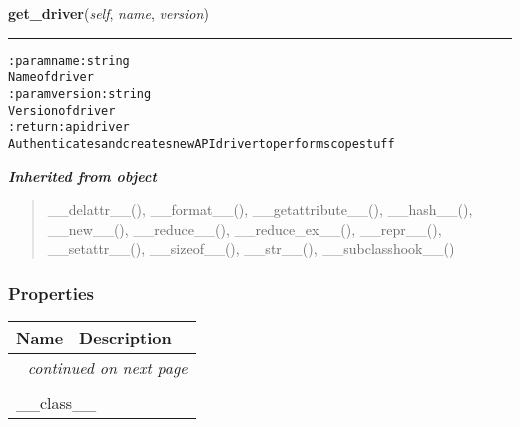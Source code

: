     \label{hal:internet:google:gauthenticator:GoogleApiOAuth:get_driver}

    \vspace{0.5ex}

\hspace{.8\funcindent}\begin{boxedminipage}{\funcwidth}

    \raggedright \textbf{get\_driver}(\textit{self}, \textit{name}, \textit{version})

    \vspace{-1.5ex}

    \rule{\textwidth}{0.5\fboxrule}
\setlength{\parskip}{2ex}
\begin{alltt}

:param name: string
    Name of driver
:param version: string
    Version of driver
:return: api driver
    Authenticates and creates new API driver to perform scope stuff
\end{alltt}

\setlength{\parskip}{1ex}
    \end{boxedminipage}


\large{\textbf{\textit{Inherited from object}}}

\begin{quote}
\_\_delattr\_\_(), \_\_format\_\_(), \_\_getattribute\_\_(), \_\_hash\_\_(), \_\_new\_\_(), \_\_reduce\_\_(), \_\_reduce\_ex\_\_(), \_\_repr\_\_(), \_\_setattr\_\_(), \_\_sizeof\_\_(), \_\_str\_\_(), \_\_subclasshook\_\_()
\end{quote}


  \subsubsection{Properties}

    \vspace{-1cm}
\hspace{\varindent}\begin{longtable}{|p{\varnamewidth}|p{\vardescrwidth}|l}
\cline{1-2}
\cline{1-2} \centering \textbf{Name} & \centering \textbf{Description}& \\
\cline{1-2}
\endhead\cline{1-2}\multicolumn{3}{r}{\small\textit{continued on next page}}\\\endfoot\cline{1-2}
\endlastfoot\multicolumn{2}{|l|}{\textit{Inherited from object}}\\
\multicolumn{2}{|p{\varwidth}|}{\raggedright \_\_class\_\_}\\
\cline{1-2}
\end{longtable}

